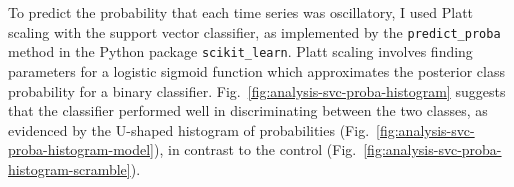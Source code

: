 
To predict the probability that each time series was oscillatory, I used Platt scaling  \parencite{plattProbabilisticOutputsSupport1999} with the support vector classifier, as implemented by the \texttt{predict\_proba} method in the Python package \texttt{scikit\_learn}.
Platt scaling involves finding parameters for a logistic sigmoid function which approximates the posterior class probability for a binary classifier.
Fig.\ \ref{fig:analysis-svc-proba-histogram} suggests that the classifier performed well in discriminating between the two classes, as evidenced by the U-shaped histogram of probabilities (Fig.\ \ref{fig:analysis-svc-proba-histogram-model}), in contrast to the control (Fig.\ \ref{fig:analysis-svc-proba-histogram-scramble}).

